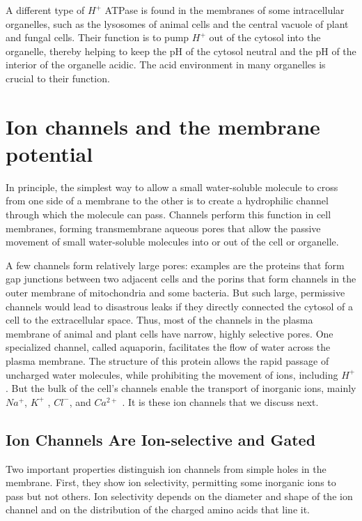 A different type of $H^{+}$ ATPase is found in the membranes of some intracellular
organelles, such as the lysosomes of animal cells and the central
vacuole of plant and fungal cells. Their function is to pump $H^{+}$ out of the
cytosol into the organelle, thereby helping to keep the pH of the cytosol
neutral and the pH of the interior of the organelle acidic. The acid environment
in many organelles is crucial to their function.

\section{Ion channels and the membrane potential}

In principle, the simplest way to allow a small water-soluble molecule to
cross from one side of a membrane to the other is to create a hydrophilic
channel through which the molecule can pass. Channels perform this
function in cell membranes, forming transmembrane aqueous pores that
allow the passive movement of small water-soluble molecules into or out
of the cell or organelle.

A few channels form relatively large pores: examples are the proteins
that form gap junctions between two adjacent cells and the porins that
form channels in the outer membrane of mitochondria and some bacteria. But such large, permissive
channels would lead to disastrous leaks if they directly connected the
cytosol of a cell to the extracellular space. Thus, most of the channels
in the plasma membrane of animal and plant cells have narrow, highly
selective pores. One specialized channel, called aquaporin, facilitates the
flow of water across the plasma membrane. The structure of this protein
allows the rapid passage of uncharged water molecules, while prohibiting
the movement of ions, including $H^{+}$ . But the bulk of the cell’s channels
enable the transport of inorganic ions, mainly $Na^{+}$, $K^{+}$ , $Cl^{-}$, and $Ca^{2+}$ . It is
these ion channels that we discuss next.

\subsection{Ion Channels Are Ion-selective and Gated}

Two important properties distinguish ion channels from simple holes in
the membrane. First, they show ion selectivity, permitting some inorganic
ions to pass but not others. Ion selectivity depends on the diameter and
shape of the ion channel and on the distribution of the charged amino acids that line it.

